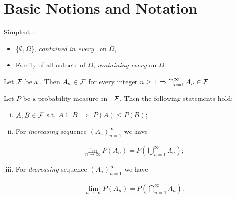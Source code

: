 
\section{Basic Notions and Notation}

\begin{example}{1.1}{}

    Simplest \SigmaAlgebra:

        \begin{itemize}
            \setlength{\parskip}{0em}
            \item $\{\emptyset, \Omega\}$, \emph{contained in every} \SigmaAlgebra \ on $\Omega$,
            \item Family of all subsets of $\Omega$, \emph{containing every} \SigmaAlgebra on $\Omega$.
        \end{itemize}

\end{example}

\begin{exercise}{1.1}{}

    Let $\mathcal{F}$ be a \SigmaAlgebra. Then $A_n \in \mathcal{F}$ for every integer $n \geq 1$ $\Rightarrow \bigcap_{n=1}^{\infty} A_n \in \mathcal{F}$.

\end{exercise}

\begin{proposition}{1.2}{}

    Let $P$ be a probability measure on \SigmaAlgebra\ $\mathcal{F}$. Then the following statements hold:

        \begin{enumerate}[(i)]
            \item $A, B \in \mathcal{F}$ s.t. $A \subseteq B$ $\Rightarrow$ $P(A) \leq P(B)$;
            \item For \emph{increasing} sequence $(A_n)_{n=1}^{\infty}$ we have

                \begin{align*}
                    \lim_{n \to \infty} P(A_n) = P\left(\bigcup_{n=1}^{\infty} A_n \right);
                \end{align*}
            \item For \emph{decreasing} sequence $(A_n)_{n=1}^{\infty}$ we have

                \begin{align*}
                    \lim_{n \to \infty} P(A_n) = P\left(\bigcap_{n=1}^{\infty} A_n \right).
                \end{align*}
        \end{enumerate}

\end{proposition}

